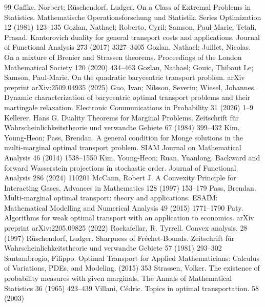\documentclass[10pt,a4paper]{amsart}
\begin{document}
\begin{thebibliography}{99}
 Gaffke, Norbert; R{\"u}schendorf, Ludger. On a Class of Extremal Problems in Statistics. Mathematische Operationsforschung und Statistik. Series Optimization 12 (1981) 123--135
 Gozlan, Nathael; Roberto, Cyril; Samson, Paul-Marie; Tetali, Prasad. Kantorovich duality for general transport costs and applications. Journal of Functional Analysis 273 (2017) 3327--3405
 Gozlan, Nathael; Juillet, Nicolas. On a mixture of {B}renier and {S}trassen theorems. Proceedings of the London Mathematical Society 120 (2020) 434--463
 Gozlan, Nathael; Gouic, Thibaut Le; Samson, Paul-Marie. On the quadratic barycentric transport problem. arXiv preprint arXiv:2509.04935 (2025)
 Guo, Ivan; Nilsson, Severin; Wiesel, Johannes. Dynamic characterization of barycentric optimal transport problems and their martingale relaxation. Electronic Communications in Probability 31 (2026) 1--9
 Kellerer, Hans G. Duality Theorems for Marginal Problems. Zeitschrift f{\"u}r Wahrscheinlichkeitstheorie und verwandte Gebiete 67 (1984) 399--432
 Kim, Young-Heon; Pass, Brendan. A general condition for Monge solutions in the multi-marginal optimal transport problem. SIAM Journal on Mathematical Analysis 46 (2014) 1538--1550
 Kim, Young-Heon; Ruan, Yuanlong. Backward and forward {W}asserstein projections in stochastic order. Journal of Functional Analysis 286 (2024) 110201
 McCann, Robert J. A Convexity Principle for Interacting Gases. Advances in {M}athematics 128 (1997) 153--179
 Pass, Brendan. Multi-marginal optimal transport: theory and applications. ESAIM: Mathematical Modelling and Numerical Analysis 49 (2015) 1771--1790
 Paty. Algorithms for weak optimal transport with an application to economics. arXiv preprint arXiv:2205.09825 (2022)
 Rockafellar, R. Tyrrell. Convex analysis. 28 (1997)
 R{\"u}schendorf, Ludger. Sharpness of {F}r{\'e}chet-{B}ounds. Zeitschrift f{\"u}r Wahrscheinlichkeitstheorie und verwandte Gebiete 57 (1981) 293--302
 Santambrogio, Filippo. Optimal Transport for Applied Mathematicians: Calculus of Variations, PDEs, and Modeling. (2015) 353
 Strassen, Volker. The existence of probability measures with given marginals. The Annals of Mathematical Statistics 36 (1965) 423--439
 Villani, C{\'e}dric. Topics in optimal transportation. 58 (2003)
\end{thebibliography}
\end{document}
